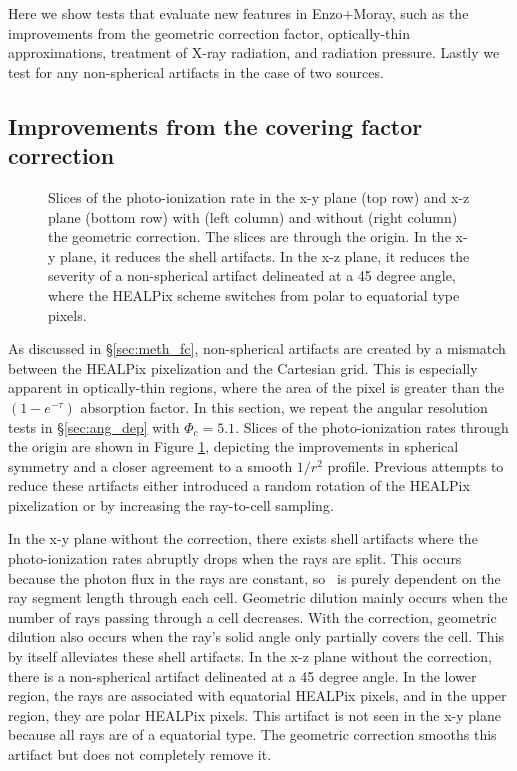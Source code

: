 \documentclass[useAMS,usenatbib]{mn2e}
\begin{document}
Here we show tests that evaluate new features in Enzo+Moray, such as
the improvements from the geometric correction factor, optically-thin
approximations, treatment of X-ray radiation, and radiation pressure.
Lastly we test for any non-spherical artifacts in the case of two
sources.

\subsection{Improvements from the covering factor correction}
\label{sec:test_fc}

\begin{figure}
  \caption{\label{fig:fc_slices} Slices of the photo-ionization rate
    in the x-y plane (top row) and x-z plane (bottom row) with (left
    column) and without (right column) the geometric correction.  The
    slices are through the origin.  In the x-y plane, it reduces the
    shell artifacts.  In the x-z plane, it reduces the severity of a
    non-spherical artifact delineated at a 45 degree angle, where the
    HEALPix scheme switches from polar to equatorial type pixels.}
\end{figure}

As discussed in \S\ref{sec:meth_fc}, non-spherical artifacts are
created by a mismatch between the HEALPix pixelization and the
Cartesian grid.  This is especially apparent in optically-thin
regions, where the area of the pixel is greater than the
$(1-e^{-\tau})$ absorption factor.  In this section, we repeat the
angular resolution tests in \S\ref{sec:ang_dep} with $\Phi_c = 5.1$.
Slices of the photo-ionization rates through the origin are shown in
Figure \ref{fig:fc_slices}, depicting the improvements in spherical
symmetry and a closer agreement to a smooth $1/r^2$ profile.  Previous
attempts to reduce these artifacts either introduced a random rotation
of the HEALPix pixelization \citep[e.g.][]{Abel02_RT, Trac07,
  Krumholz07_ART} or by increasing the ray-to-cell sampling.

In the x-y plane without the correction, there exists shell artifacts
where the photo-ionization rates abruptly drops when the rays are
split.  This occurs because the photon flux in the rays are constant,
so \kph~is purely dependent on the ray segment length through each
cell.  Geometric dilution mainly occurs when the number of rays
passing through a cell decreases.  With the correction, geometric
dilution also occurs when the ray's solid angle only partially covers
the cell.  This by itself alleviates these shell artifacts.  In the
x-z plane without the correction, there is a non-spherical artifact
delineated at a 45 degree angle.  In the lower region, the rays are
associated with equatorial HEALPix pixels, and in the upper region,
they are polar HEALPix pixels.  This artifact is not seen in the x-y
plane because all rays are of a equatorial type.  The geometric
correction smooths this artifact but does not completely remove it.
\end{document}
